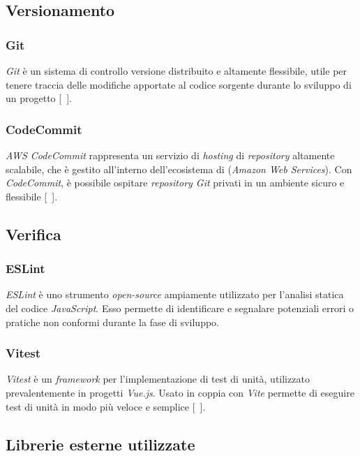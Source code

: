 \subsection{Versionamento}\label{subsec:versionamento}
\subsubsection{Git}\label{subsubsec:git}
\textit{Git} è un sistema di controllo versione distribuito e altamente flessibile, utile per tenere traccia delle modifiche apportate al codice sorgente durante lo sviluppo di un progetto  [~\cite{site:git}].
\subsubsection{CodeCommit}\label{subsubsec:code-commit}
\textit{AWS CodeCommit} rappresenta un servizio di \textit{hosting} di \textit{repository} altamente scalabile, che è gestito all'interno dell'ecosistema di  (\textit{Amazon Web Services}). 
Con \textit{CodeCommit}, è possibile ospitare \textit{repository Git} privati in un ambiente sicuro e flessibile [~\cite{site:code-commit}].

\subsection{Verifica}\label{subsec:verifica}
\subsubsection{ESLint}\label{subsubsec:eslint}
\textit{ESLint} è uno strumento \textit{open-source} ampiamente utilizzato per l'analisi statica del codice \textit{JavaScript}. Esso permette di identificare e segnalare potenziali errori o pratiche non conformi durante la fase di sviluppo.
\subsubsection{Vitest}\label{subsubsec:vitest}
\textit{Vitest} è un \textit{framework} per l'implementazione di test di unità, utilizzato prevalentemente in progetti \textit{Vue.js}.
Usato in coppia con \textit{Vite} permette di eseguire test di unità in modo più veloce e semplice [~\cite{site:vitest}].

\subsection{Librerie esterne utilizzate}\label{subsec:librerie-esterne}
